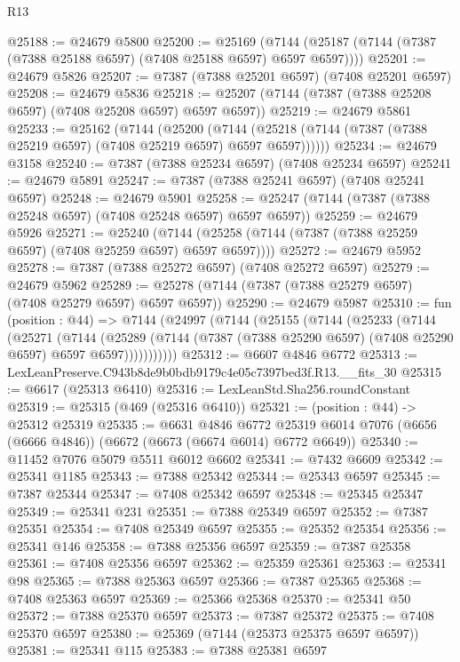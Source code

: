 \begin{lexlean}{R13}
\begin{coremodule}
@25188 := @24679 @5800
@25200 := @25169
    (@7144 (@25187 (@7144 (@7387 (@7388 @25188 @6597) (@7408 @25188 @6597) @6597 @6597))))
@25201 := @24679 @5826
@25207 := @7387 (@7388 @25201 @6597) (@7408 @25201 @6597)
@25208 := @24679 @5836
@25218 := @25207 (@7144 (@7387 (@7388 @25208 @6597) (@7408 @25208 @6597) @6597 @6597))
@25219 := @24679 @5861
@25233 := @25162
    (@7144
      (@25200
        (@7144 (@25218 (@7144 (@7387 (@7388 @25219 @6597) (@7408 @25219 @6597) @6597 @6597))))))
@25234 := @24679 @3158
@25240 := @7387 (@7388 @25234 @6597) (@7408 @25234 @6597)
@25241 := @24679 @5891
@25247 := @7387 (@7388 @25241 @6597) (@7408 @25241 @6597)
@25248 := @24679 @5901
@25258 := @25247 (@7144 (@7387 (@7388 @25248 @6597) (@7408 @25248 @6597) @6597 @6597))
@25259 := @24679 @5926
@25271 := @25240
    (@7144 (@25258 (@7144 (@7387 (@7388 @25259 @6597) (@7408 @25259 @6597) @6597 @6597))))
@25272 := @24679 @5952
@25278 := @7387 (@7388 @25272 @6597) (@7408 @25272 @6597)
@25279 := @24679 @5962
@25289 := @25278 (@7144 (@7387 (@7388 @25279 @6597) (@7408 @25279 @6597) @6597 @6597))
@25290 := @24679 @5987
@25310 := fun (position : @44) =>
  @7144
    (@24997
      (@7144
        (@25155
          (@7144
            (@25233
              (@7144
                (@25271
                  (@7144
                    (@25289
                      (@7144 (@7387 (@7388 @25290 @6597) (@7408 @25290 @6597) @6597 @6597)))))))))))
@25312 := @6607 @4846 @6772
@25313 := LexLeanPreserve.C943b8de9b0bdb9179c4e05c7397bed3f.R13.__fits_30
@25315 := @6617 (@25313 @6410)
@25316 := LexLeanStd.Sha256.roundConstant
@25319 := @25315 (@469 (@25316 @6410))
@25321 := (position : @44) -> @25312 @25319
@25335 := @6631
    @4846
    @6772
    @25319
    @6014
    @7076
    (@6656 (@6666 @4846))
    (@6672 (@6673 (@6674 @6014) @6772 @6649))
@25340 := @11452 @7076 @5079 @5511 @6012 @6602
@25341 := @7432 @6609
@25342 := @25341 @1185
@25343 := @7388 @25342
@25344 := @25343 @6597
@25345 := @7387 @25344
@25347 := @7408 @25342 @6597
@25348 := @25345 @25347
@25349 := @25341 @231
@25351 := @7388 @25349 @6597
@25352 := @7387 @25351
@25354 := @7408 @25349 @6597
@25355 := @25352 @25354
@25356 := @25341 @146
@25358 := @7388 @25356 @6597
@25359 := @7387 @25358
@25361 := @7408 @25356 @6597
@25362 := @25359 @25361
@25363 := @25341 @98
@25365 := @7388 @25363 @6597
@25366 := @7387 @25365
@25368 := @7408 @25363 @6597
@25369 := @25366 @25368
@25370 := @25341 @50
@25372 := @7388 @25370 @6597
@25373 := @7387 @25372
@25375 := @7408 @25370 @6597
@25380 := @25369 (@7144 (@25373 @25375 @6597 @6597))
@25381 := @25341 @115
@25383 := @7388 @25381 @6597

\end{coremodule}
\end{lexlean}
